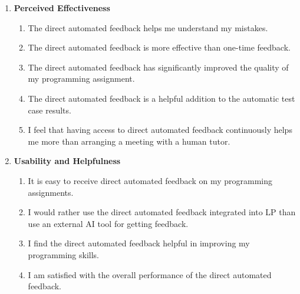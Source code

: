 \documentclass[sigconf,screen,review,anonymous]{acmart}
\begin{document}
\begin{enumerate}[label=\textbf{RQ\arabic*}]
\begin{enumerate}[label=\textbf{Q\arabic*},resume,ref=Q\arabic*, leftmargin=*, itemindent=1.5em]
  \end{enumerate}
  \item \textbf{Perceived Effectiveness}
    \begin{enumerate}[label=\textbf{Q\arabic*},resume,ref=Q\arabic*, leftmargin=*, itemindent=1.5em]
      \item \label{Q5} The direct automated feedback helps me understand my mistakes.
      \item \label{Q6} The direct automated feedback is more effective than one-time feedback.
      \item \label{Q7} The direct automated feedback has significantly improved the quality of my programming assignment.
      \item \label{Q8} The direct automated feedback is a helpful addition to the automatic test case results.
      \item \label{Q9} I feel that having access to direct automated feedback continuously helps me more than arranging a meeting with a human tutor.
    \end{enumerate}
  \item \textbf{Usability and Helpfulness}
    \begin{enumerate}[label=\textbf{Q\arabic*},resume,ref=Q\arabic*, leftmargin=*, itemindent=1.5em]
      \item \label{Q10} It is easy to receive direct automated feedback on my programming assignments.
      \item \label{Q11} I would rather use the direct automated feedback integrated into LP than use an external AI tool for getting feedback.
      \item \label{Q12} I find the direct automated feedback helpful in improving my programming skills.
      \item \label{Q13} I am satisfied with the overall performance of the direct automated feedback.
    \end{enumerate}
\end{enumerate}
\end{document}
